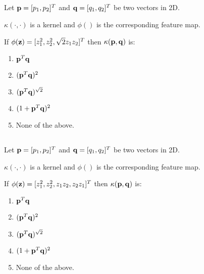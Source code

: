 \begin{frame}
\section{}
Let ${\bf p} = [p_1, p_2]^T$ and ${\bf q} = [q_1, q_2]^T$ be two vectors in 2D.

$\kappa(\cdot,\cdot)$ is a kernel and $\phi()$ is the corresponding feature map.

If $\phi({\bf z}) = [z_1^2, z_2^2, \sqrt{2}z_1 z_2]^T$ then $\kappa({\bf p}, {\bf q})$ is:
\begin{enumerate}[label=(\Alph*)]
\item ${\bf p}^T{\bf q}$
\item $({\bf p}^T{\bf q})^2$    %
\item $({\bf p}^T{\bf q})^{\sqrt{2}}$
\item $(1+{\bf p}^T{\bf q})^2$
\item None of the above.  %
\end{enumerate}
\end{frame}


\begin{frame}
\section{}
Let ${\bf p} = [p_1, p_2]^T$ and ${\bf q} = [q_1, q_2]^T$ be two vectors in 2D.

$\kappa(\cdot,\cdot)$ is a kernel and $\phi()$ is the corresponding feature map.

If $\phi({\bf z}) = [z_1^2, z_2^2, z_1 z_2,  z_2 z_1]^T$ then $\kappa({\bf p}, {\bf q})$ is:
\begin{enumerate}[label=(\Alph*)]
\item ${\bf p}^T{\bf q}$
\item $({\bf p}^T{\bf q})^2$    %
\item $({\bf p}^T{\bf q})^{\sqrt{2}}$
\item $(1+{\bf p}^T{\bf q})^2$
\item None of the above.  %
\end{enumerate}
\end{frame}

